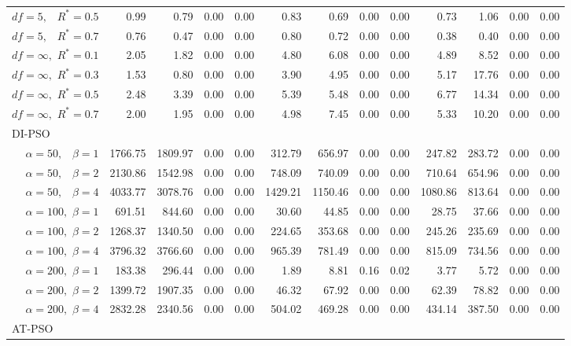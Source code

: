 \documentclass[12pt]{article}
\begin{document}
\begin{table}[ht]
{\begin{tabular}{r|rrrr|rrrr|rrrr}
  $df = 5,\enspace$ $R^* =0.5$ & 0.99 & 0.79 & 0.00 & 0.00 & 0.83 & 0.69 & 0.00 & 0.00 & 0.73 & 1.06 & 0.00 & 0.00 \\ 
  $df = 5,\enspace$ $R^* =0.7$ & 0.76 & 0.47 & 0.00 & 0.00 & 0.80 & 0.72 & 0.00 & 0.00 & 0.38 & 0.40 & 0.00 & 0.00 \\ 
  $df = \infty,$ $R^* =0.1$ & 2.05 & 1.82 & 0.00 & 0.00 & 4.80 & 6.08 & 0.00 & 0.00 & 4.89 & 8.52 & 0.00 & 0.00 \\ 
  $df = \infty,$ $R^* =0.3$ & 1.53 & 0.80 & 0.00 & 0.00 & 3.90 & 4.95 & 0.00 & 0.00 & 5.17 & 17.76 & 0.00 & 0.00 \\ 
  $df = \infty,$ $R^* =0.5$ & 2.48 & 3.39 & 0.00 & 0.00 & 5.39 & 5.48 & 0.00 & 0.00 & 6.77 & 14.34 & 0.00 & 0.00 \\ 
  $df = \infty,$ $R^* =0.7$ & 2.00 & 1.95 & 0.00 & 0.00 & 4.98 & 7.45 & 0.00 & 0.00 & 5.33 & 10.20 & 0.00 & 0.00 \\ 
\hline
\multicolumn{1}{l|}{DI-PSO} &&&&&&&&&&&&\\
  $\alpha = 50,\enspace$ $\beta =1$ & 1766.75 & 1809.97 & 0.00 & 0.00 & 312.79 & 656.97 & 0.00 & 0.00 & 247.82 & 283.72 & 0.00 & 0.00 \\ 
  $\alpha = 50,\enspace$ $\beta =2$ & 2130.86 & 1542.98 & 0.00 & 0.00 & 748.09 & 740.09 & 0.00 & 0.00 & 710.64 & 654.96 & 0.00 & 0.00 \\ 
  $\alpha = 50,\enspace$ $\beta =4$ & 4033.77 & 3078.76 & 0.00 & 0.00 & 1429.21 & 1150.46 & 0.00 & 0.00 & 1080.86 & 813.64 & 0.00 & 0.00 \\ 
  $\alpha = 100,$ $\beta =1$ & 691.51 & 844.60 & 0.00 & 0.00 & 30.60 & 44.85 & 0.00 & 0.00 & 28.75 & 37.66 & 0.00 & 0.00 \\ 
  $\alpha = 100,$ $\beta =2$ & 1268.37 & 1340.50 & 0.00 & 0.00 & 224.65 & 353.68 & 0.00 & 0.00 & 245.26 & 235.69 & 0.00 & 0.00 \\ 
  $\alpha = 100,$ $\beta =4$ & 3796.32 & 3766.60 & 0.00 & 0.00 & 965.39 & 781.49 & 0.00 & 0.00 & 815.09 & 734.56 & 0.00 & 0.00 \\ 
  $\alpha = 200,$ $\beta =1$ & 183.38 & 296.44 & 0.00 & 0.00 & 1.89 & 8.81 & 0.16 & 0.02 & 3.77 & 5.72 & 0.00 & 0.00 \\ 
  $\alpha = 200,$ $\beta =2$ & 1399.72 & 1907.35 & 0.00 & 0.00 & 46.32 & 67.92 & 0.00 & 0.00 & 62.39 & 78.82 & 0.00 & 0.00 \\ 
  $\alpha = 200,$ $\beta =4$ & 2832.28 & 2340.56 & 0.00 & 0.00 & 504.02 & 469.28 & 0.00 & 0.00 & 434.14 & 387.50 & 0.00 & 0.00 \\ 
\hline
\multicolumn{1}{l|}{AT-PSO} &&&&&&&&&&&&\\

\end{tabular}}
\end{table}
\end{document}
